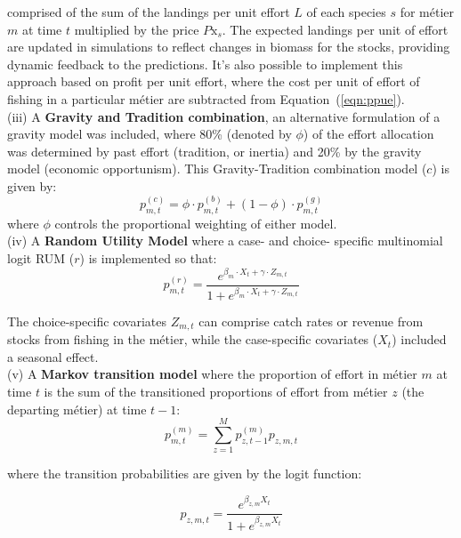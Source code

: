 \documentclass[12pt, halfline, a4paper]{ouparticle}
\begin{document}
comprised of the sum of the landings per unit effort $L$ of each species $s$
for métier $m$ at time $t$ multiplied by the price $P\text{x}_{s}$. The
expected landings per unit of effort are updated in simulations to reflect
changes in biomass for the stocks, providing dynamic feedback to the
predictions. It's also possible to implement this approach based on profit per
unit effort, where the cost per unit of effort of fishing in a particular
métier are subtracted from Equation~(\ref{eqn:ppue}). \\

(iii) A \textbf{Gravity and Tradition combination}, an alternative formulation
of a gravity model was included, where 80\% (denoted by $\phi$) of the effort
allocation was determined by past effort (tradition, or inertia) and 20\% by
the gravity model (economic opportunism).  This Gravity-Tradition combination
model ($c$) is given by:
\begin{equation}
	p^{(c)}_{m,t} = \phi \cdot p^{(b)}_{m,t} + (1 - \phi) \cdot p^{(g)}_{m,t}
\end{equation}
where $\phi$ controls the proportional weighting of either model. \\ 

(iv) A \textbf{Random Utility Model} where a case- and choice- specific
multinomial logit RUM ($r$) is implemented so that:  
\begin{equation}
p^{(r)}_{m,t} = \frac{e^{\beta_{m} \cdot X_{t} + \gamma \cdot Z_{m,t}}}{1 + 
	e^{\beta_{m} \cdot X_{t} + \gamma \cdot Z_{m,t}}}
\label{eqn:rum}
\end{equation} 

The choice-specific covariates $Z_{m,t}$ can comprise catch rates or revenue
from stocks from fishing in the métier, while the case-specific covariates
($X_{t}$) included a seasonal effect. \\

(v) A \textbf{Markov transition model} where the proportion of effort in métier
$m$ at time $t$ is the sum of the transitioned proportions of effort from
métier $z$ (the departing métier) at time $t-1$:
\begin{equation}
p^{(m)}_{m,t} = \sum_{z = 1}^{M} p^{(m)}_{z, t-1} p_{z,m,t}
\end{equation}

where the transition probabilities are given by the logit function:

\begin{equation}
p_{z,m,t} = \frac{e^{\beta_{z,m} X_{t}}}{1+e^{\beta_{z,m} X_{t}}}
\end{equation}
\end{document}
